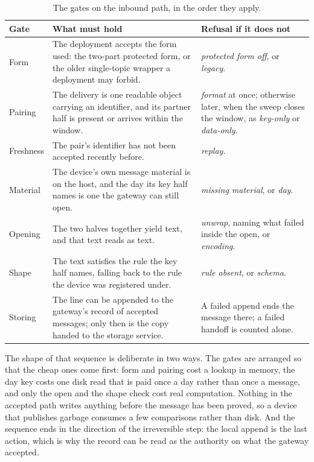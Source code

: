 \documentclass[12pt,a4paper]{report}
\begin{document}
\begin{table}[htbp]
\centering
{\small
\begin{tabularx}{\textwidth}{@{}p{2.2cm}Yp{5.2cm}@{}}
\toprule
\textbf{Gate} & \textbf{What must hold} & \textbf{Refusal if it does not} \\
\midrule
Form &
The deployment accepts the form used: the two-part protected form, or
the older single-topic wrapper a deployment may forbid. &
\emph{protected form off}, or \emph{legacy}. \\
\midrule
Pairing &
The delivery is one readable object carrying an identifier, and its
partner half is present or arrives within the window. &
\emph{format} at once; otherwise later, when the sweep closes the
window, as \emph{key-only} or \emph{data-only}. \\
\midrule
Freshness &
The pair's identifier has not been accepted recently before. &
\emph{replay}. \\
\midrule
Material &
The device's own message material is on the host, and the day its key
half names is one the gateway can still open. &
\emph{missing material}, or \emph{day}. \\
\midrule
Opening &
The two halves together yield text, and that text reads as text. &
\emph{unwrap}, naming what failed inside the open, or \emph{encoding}. \\
\midrule
Shape &
The text satisfies the rule the key half names, falling back to the
rule the device was registered under. &
\emph{rule absent}, or \emph{schema}. \\
\midrule
Storing &
The line can be appended to the gateway's record of accepted messages;
only then is the copy handed to the storage service. &
A failed append ends the message there; a failed handoff is counted
alone. \\
\bottomrule
\end{tabularx}}
\caption{The gates on the inbound path, in the order they
apply.}
\label{tab:gw-inbound-steps}
\end{table}

The shape of that sequence is deliberate in two ways. The gates are
arranged so that the cheap ones come first: form and pairing cost a
lookup in memory, the day key costs one disk read that is paid once a
day rather than once a message, and only the open and the shape check
cost real computation. Nothing in the accepted path writes anything
before the message has been proved, so a device that publishes garbage
consumes a few comparisons rather than disk. And the sequence ends in
the direction of the irreversible step: the local append is the last
action, which is why the record can be read as the authority on what
the gateway accepted.
\end{document}
